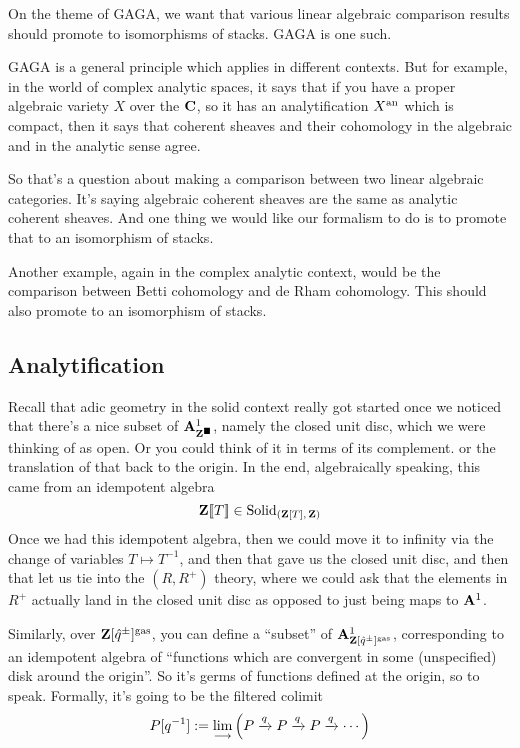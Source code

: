 \begin{example}
  On the theme of GAGA, we want that various linear algebraic comparison results should promote to isomorphisms of stacks. GAGA is one such.
  
  GAGA is a general principle which applies in different contexts. But for example, in the world of complex analytic spaces, it says that if you have a proper algebraic variety $X$ over the $\mathbf C$, so it has an analytification $X^{\mathrm{an}}$ which is compact, then it says that coherent sheaves and their cohomology in the algebraic and in the analytic sense agree.
  
  So that's a question about making a comparison between two linear algebraic categories. It's saying algebraic coherent sheaves are the same as analytic coherent sheaves. And one thing we would like our formalism to do is to promote that to an isomorphism of stacks.

  Another example, again in the complex analytic context, would be the comparison between Betti cohomology and de Rham cohomology. This should also promote to an isomorphism of stacks.
\end{example}

\subsection{Analytification}
Recall that adic geometry in the solid context really got started once we noticed that there's a nice subset of $\mathbf A^1_{\mathbf Z^\blacksquare}$, namely the closed unit disc, which we were thinking of as open. Or you could think of it in terms of its complement. or the translation of that back to the origin. In the end, algebraically speaking, this came from an idempotent algebra
\[ \mathbf Z[\![T]\!] \in \mathrm{Solid}_{(\mathbf Z[T],\,\mathbf Z)} \]
Once we had this idempotent algebra, then we could move it to infinity via the change of variables $T\mapsto T^{-1}$, and then that gave us the closed unit disc, and then that let us tie into the $(R,R^+)$ theory, where we could ask that the elements in $R^+$ actually land in the closed unit disc as opposed to just being maps to $\mathbf A^1$.

Similarly, over $\mathbf Z[\hat q^\pm]^{\mathrm{gas}}$, you can define a ``subset'' of $\mathbf A^1_{\mathbf Z[\hat q^\pm]^{\mathrm{gas}}}$, corresponding to an idempotent algebra of ``functions which are convergent in some (unspecified) disk around the origin''. So it's germs of functions defined at the origin, so to speak. Formally, it's going to be the filtered colimit
\[ P[q^{-1}] \mathrel{:=} \mathop{\operatorname*{lim}\limits_{\longrightarrow}}\limits\left(P \xrightarrow q P \xrightarrow q P \xrightarrow q \dotsb \right) \]

